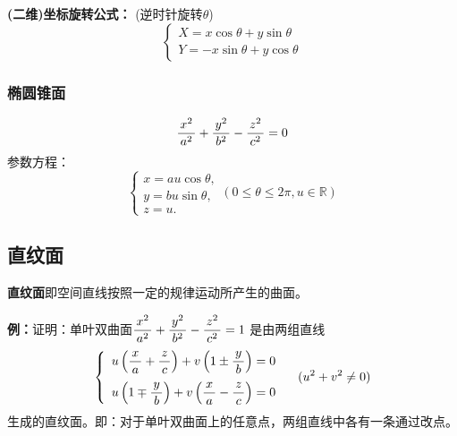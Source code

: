 {\bf (二维)坐标旋转公式：}{ (逆时针旋转$\theta$)}
$${\left\{\begin{array}{l}
	X=x\cos\theta+y\sin\theta\\
	Y=-x\sin\theta+y\cos\theta
\end{array}\right.}$$

\subsubsection{椭圆锥面}
$${\displaystyle\frac{\,{x^2}\,}{\,{a^2}\,}+\displaystyle\frac{\,{y^2}\,}{\,{b^2}\,}-\displaystyle\frac{\,{z^2}\,}{\,{c^2}\,}=0}$$
参数方程：
$$\left\{\begin{array}{l}
	x=au\cos\theta,\\
	y=bu\sin\theta,\\
	z=u.
\end{array}\right.(0\leq\theta\leq 2\pi,u\in\mathbb{R})$$

\subsection{直纹面}

{\bf 直纹面}即空间直线按照一定的规律运动所产生的曲面。

{\bf 例：}证明：单叶双曲面$\displaystyle\frac{\,{x^2}\,}{\,{a^2}\,}+\displaystyle\frac{\,{y^2}\,}{\,{b^2}\,}-\displaystyle\frac{\,{z^2}\,}{\,{c^2}\,}=1$
是由两组直线
$$\left\{\begin{array}{l}
	u\left(\displaystyle\frac{\,{x}\,}{\,{a}\,}+\displaystyle\frac{\,{z}\,}{\,{c}\,}\right)+v\left(1\pm\displaystyle\frac{\,{y}\,}{\,{b}\,}\right)=0\\[1em]
	u\left(1\mp\displaystyle\frac{\,{y}\,}{\,{b}\,}\right)+v\left(\displaystyle\frac{\,{x}\,}{\,{a}\,}-\displaystyle\frac{\,{z}\,}{\,{c}\,}\right)=0
\end{array}\right.\quad (u^2+v^2\ne 0)$$
生成的直纹面。即：对于单叶双曲面上的任意点，两组直线中各有一条通过改点。

\begin{center}
\end{center}

